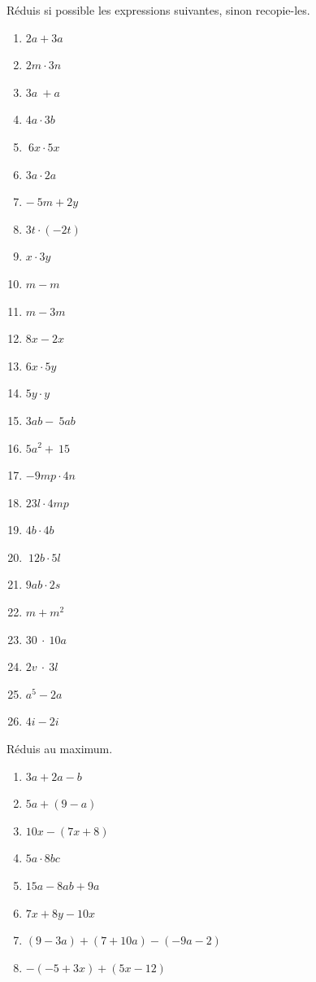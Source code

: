 \documentclass[../../syllabus_1.tex]{subfiles}
\begin{document}
\begin{exercise}
    Réduis si possible les expressions suivantes, sinon recopie-les.
    \begin{enumerate}[cols=3, itemsep=.6cm]
        \item \(2a + 3a \)
        \item \(2m\cdot3n \)
        \item \(3a\  + a \)
        \item \(4a\cdot3b \)
        \item \(\ 6x\cdot5x\  \)
        \item \(3a\cdot2a \)
        \item \(- \ 5m + 2y \)
        \item \(3t\cdot( - 2t) \)
        \item \(x\cdot3y \)
        \item \( m - m \)
        \item  \(m - 3m \)
        \item \(8x - 2x \)
        \item \(6x\cdot5y \)
        \item \(5y\cdot y \)
        \item \(3ab - \ 5ab \)
        \item \(5a^2  + \ 15 \)
        \item \(- 9mp\cdot4n \)
        \item \(23l \cdot 4mp \)
        \item \(4b\cdot4b \)
        \item \(\ 12b\cdot5l\  \)
        \item \(9ab\cdot2s \)
        \item \(m + m^{2} \)
        \item \(30\ \cdot\ 10a \)
        \item \(2v\ \cdot\ 3l \)
        \item \( a^5 - 2a \)
        \item \(4i - 2i \)
    \end{enumerate}
\end{exercise}

\begin{exercise}
    Réduis au maximum.
    \begin{enumerate}[cols=2, itemsep=.6cm]
        \item \(3a + 2a - b\)
        \item \(5a + (9 - a)\)
        \item \(10x - (7x + 8)\)
        \item \(5a \cdot 8bc\)
        \item \(15a - 8ab + 9a\)
        \item \(7x + 8y - 10x\)
        \item \((9 - 3a) + (7 + 10a) - ( - 9a - 2)\)
        \item \(- ( - 5 + 3x) + (5x - 12)\)
    \end{enumerate}
\end{exercise}
\end{document}
